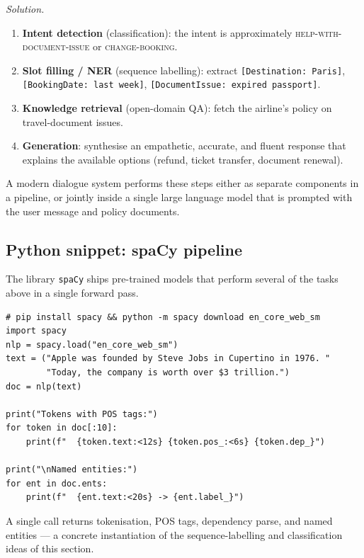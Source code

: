 \documentclass[12pt,a4paper]{report}
\theoremstyle{definition}
\theoremstyle{remark}
\begin{document}
\textit{Solution.}
\begin{enumerate}
    \item \textbf{Intent detection} (classification): the intent is approximately \textsc{help-with-document-issue} or \textsc{change-booking}.
    \item \textbf{Slot filling / NER} (sequence labelling): extract \texttt{[Destination: Paris]}, \texttt{[BookingDate: last week]}, \texttt{[DocumentIssue: expired passport]}.
    \item \textbf{Knowledge retrieval} (open-domain QA): fetch the airline's policy on travel-document issues.
    \item \textbf{Generation}: synthesise an empathetic, accurate, and fluent response that explains the available options (refund, ticket transfer, document renewal).
\end{enumerate}
A modern dialogue system performs these steps either as separate components in a pipeline, or jointly inside a single large language model that is prompted with the user message and policy documents.

\subsection{Python snippet: spaCy pipeline}

The library \texttt{spaCy} ships pre-trained models that perform several of the tasks above in a single forward pass.

\begin{lstlisting}
# pip install spacy && python -m spacy download en_core_web_sm
import spacy
nlp = spacy.load("en_core_web_sm")
text = ("Apple was founded by Steve Jobs in Cupertino in 1976. "
        "Today, the company is worth over $3 trillion.")
doc = nlp(text)

print("Tokens with POS tags:")
for token in doc[:10]:
    print(f"  {token.text:<12s} {token.pos_:<6s} {token.dep_}")

print("\nNamed entities:")
for ent in doc.ents:
    print(f"  {ent.text:<20s} -> {ent.label_}")
\end{lstlisting}

A single call returns tokenisation, POS tags, dependency parse, and named entities --- a concrete instantiation of the sequence-labelling and classification ideas of this section.
\end{document}
